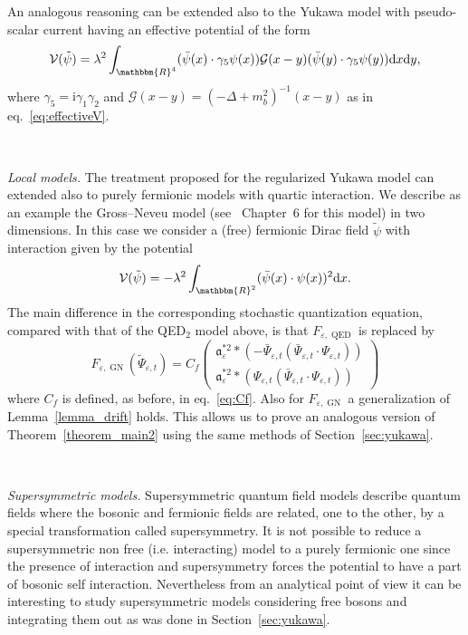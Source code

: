 \documentclass[11pt]{article}
\newcommand{\asterisk}{\mathord{*}}
\newcommand{\mathd}{\mathrm{d}}
\newcommand{\mathi}{\mathrm{i}}
\newcommand{\tmop}[1]{\ensuremath{\operatorname{#1}}}
\newcommand{\tmtextit}[1]{{\itshape{#1}}}
\begin{document}
An analogous reasoning can be extended also to the Yukawa model with
pseudo-scalar current having an effective potential of the form
\[ \mathcal{V} (\tilde{\psi}) = \lambda^2 \int_{\mathbbm{R}^4} (\bar{\psi} (x)
   \cdot \gamma_5 \psi (x)) \mathcal{G} (x - y) (\bar{\psi} (y) \cdot \gamma_5
   \psi (y)) \mathd x \mathd y, \]
where $\gamma_5 = \mathi \gamma_1 \gamma_2$ and $\mathcal{G} (x - y) = (-
\Delta + m_b^2)^{- 1} (x - y)$ as in eq.~{\eqref{eq:effectiveV}}.

\

\tmtextit{Local models.} The treatment proposed for the regularized Yukawa
model can extended also to purely fermionic models with quartic interaction.
We describe as an example the Gross--Neveu model
(see~{\cite{mastropietro_non-perturbative_2008}} Chapter~6 for this model) in
two dimensions. In this case we consider a (free) fermionic Dirac field
$\tilde{\psi}$ with interaction given by the potential
\[ \mathcal{V} (\tilde{\psi}) = - \lambda^2 \int_{\mathbbm{R}^2} (\bar{\psi}
   (x) \cdot \psi (x))^2 \mathd x. \]
The main difference in the corresponding stochastic quantization equation,
compared with that of the QED$_2$ model above, is that $F_{\varepsilon,
\tmop{QED}}$ is replaced by
\[ F_{\varepsilon, \tmop{GN}} (\tilde{\Psi}_{\varepsilon, t}) = C_f \left(
   \begin{array}{l}
     \mathfrak{a}_{\varepsilon}^{\asterisk 2} \ast (- \bar{\Psi}_{\varepsilon,
     t} (\bar{\Psi}_{\varepsilon, t} \cdot \Psi_{\varepsilon, t}))\\
     \mathfrak{a}_{\varepsilon}^{\asterisk 2} \ast (\Psi_{\varepsilon, t}
     (\bar{\Psi}_{\varepsilon, t} \cdot \Psi_{\varepsilon, t}))
   \end{array} \right) \]
where $C_f$ is defined, as before, in eq.~{\eqref{eq:Cf}}. Also for
$F_{\varepsilon, \tmop{GN}}$ a generalization of Lemma~\ref{lemma_drift}
holds. This allows us to prove an analogous version of
Theorem~\ref{theorem_main2} using the same methods of
Section~\ref{sec:yukawa}.

\

\tmtextit{Supersymmetric models.} Supersymmetric quantum field models
describe quantum fields where the bosonic and fermionic fields are related,
one to the other, by a special transformation called supersymmetry. It is not
possible to reduce a supersymmetric non free (i.e. interacting) model to a
purely fermionic one since the presence of interaction and supersymmetry
forces the potential to have a part of bosonic self interaction. Nevertheless
from an analytical point of view it can be interesting to study supersymmetric
models considering free bosons and integrating them out as was done in
Section~\ref{sec:yukawa}.
\end{document}
